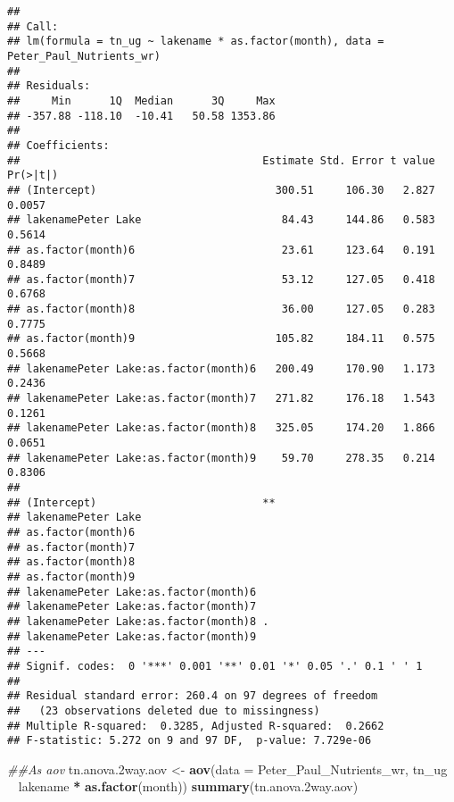\documentclass[]{article}
\newenvironment{Shaded}{\begin{snugshade}}{\end{snugshade}}
\newcommand{\CommentTok}[1]{\textcolor[rgb]{0.56,0.35,0.01}{\textit{#1}}}
\newcommand{\DataTypeTok}[1]{\textcolor[rgb]{0.13,0.29,0.53}{#1}}
\newcommand{\FloatTok}[1]{\textcolor[rgb]{0.00,0.00,0.81}{#1}}
\newcommand{\KeywordTok}[1]{\textcolor[rgb]{0.13,0.29,0.53}{\textbf{#1}}}
\newcommand{\NormalTok}[1]{#1}
\newcommand{\OperatorTok}[1]{\textcolor[rgb]{0.81,0.36,0.00}{\textbf{#1}}}
\newcommand{\StringTok}[1]{\textcolor[rgb]{0.31,0.60,0.02}{#1}}
\begin{document}
\begin{verbatim}
## 
## Call:
## lm(formula = tn_ug ~ lakename * as.factor(month), data = Peter_Paul_Nutrients_wr)
## 
## Residuals:
##     Min      1Q  Median      3Q     Max 
## -357.88 -118.10  -10.41   50.58 1353.86 
## 
## Coefficients:
##                                      Estimate Std. Error t value Pr(>|t|)
## (Intercept)                            300.51     106.30   2.827   0.0057
## lakenamePeter Lake                      84.43     144.86   0.583   0.5614
## as.factor(month)6                       23.61     123.64   0.191   0.8489
## as.factor(month)7                       53.12     127.05   0.418   0.6768
## as.factor(month)8                       36.00     127.05   0.283   0.7775
## as.factor(month)9                      105.82     184.11   0.575   0.5668
## lakenamePeter Lake:as.factor(month)6   200.49     170.90   1.173   0.2436
## lakenamePeter Lake:as.factor(month)7   271.82     176.18   1.543   0.1261
## lakenamePeter Lake:as.factor(month)8   325.05     174.20   1.866   0.0651
## lakenamePeter Lake:as.factor(month)9    59.70     278.35   0.214   0.8306
##                                        
## (Intercept)                          **
## lakenamePeter Lake                     
## as.factor(month)6                      
## as.factor(month)7                      
## as.factor(month)8                      
## as.factor(month)9                      
## lakenamePeter Lake:as.factor(month)6   
## lakenamePeter Lake:as.factor(month)7   
## lakenamePeter Lake:as.factor(month)8 . 
## lakenamePeter Lake:as.factor(month)9   
## ---
## Signif. codes:  0 '***' 0.001 '**' 0.01 '*' 0.05 '.' 0.1 ' ' 1
## 
## Residual standard error: 260.4 on 97 degrees of freedom
##   (23 observations deleted due to missingness)
## Multiple R-squared:  0.3285, Adjusted R-squared:  0.2662 
## F-statistic: 5.272 on 9 and 97 DF,  p-value: 7.729e-06
\end{verbatim}

\begin{Shaded}
\begin{Highlighting}[]
\CommentTok{##As aov}
\NormalTok{tn.anova}\FloatTok{.2}\NormalTok{way.aov <-}\StringTok{ }\KeywordTok{aov}\NormalTok{(}\DataTypeTok{data =}\NormalTok{ Peter_Paul_Nutrients_wr, tn_ug }\OperatorTok{~}\StringTok{ }\NormalTok{lakename }\OperatorTok{*}\StringTok{ }\KeywordTok{as.factor}\NormalTok{(month))}
\KeywordTok{summary}\NormalTok{(tn.anova}\FloatTok{.2}\NormalTok{way.aov)}
\end{Highlighting}
\end{Shaded}
\end{document}
